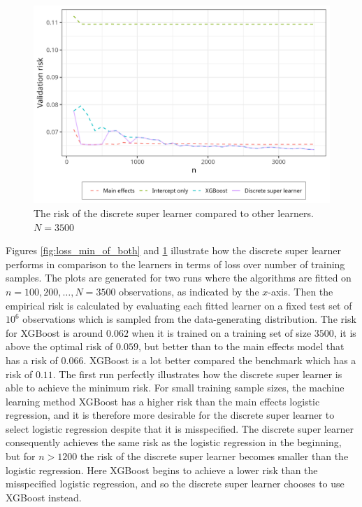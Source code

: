 \documentclass[./main.tex]{subfiles}
\begin{document}
\begin{figure}[H]
    \centering
    \includegraphics[width=\textwidth]{figures/dsl_loss_jumps.png}
    \caption{The risk of the discrete super learner compared to other learners. $ N = 3500 $}
    \label{fig:loss_jumps}
\end{figure}
Figures \ref{fig:loss_min_of_both} and \ref{fig:loss_jumps} illustrate how the discrete super learner performs in comparison to the learners in terms of loss over number of training samples. The plots are generated for two runs where the algorithms are fitted on $ n = 100, 200, \dots , N = 3500 $ observations, as indicated by the $ x $-axis. Then the empirical risk is calculated by evaluating each fitted learner on a fixed test set of $ 10^{6} $ observations which is sampled from the data-generating distribution.  
The risk for XGBoost is around $ 0.062 $ when it is trained on a training set of size $ 3500 $, it is above the optimal risk of $ 0.059 $, but better than to the main effects model that has a risk of $ 0.066 $. XGBoost is a lot better compared the benchmark which has a risk of $ 0.11 $. 
The first run perfectly illustrates how the discrete super learner is able to achieve the minimum risk. For small training sample sizes, the machine learning method XGBoost has a higher risk than the main effects logistic regression, and it is therefore more desirable for the discrete super learner to select logistic regression despite that it is misspecified. The discrete super learner consequently achieves the same risk as the logistic regression in the beginning, but for $ n > 1200 $ the risk of the discrete super learner becomes smaller than the logistic regression. Here XGBoost begins to achieve a lower risk than the misspecified logistic regression, and so the discrete super learner chooses to use XGBoost instead. 
\end{document}
